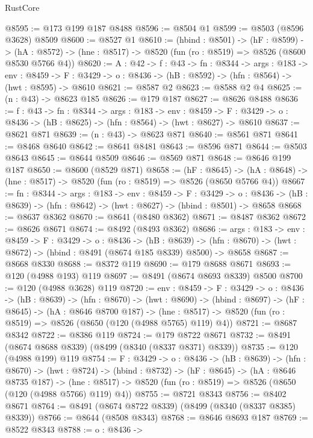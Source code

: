 \begin{lexlean}{RustCore}
\begin{coremodule}
@8595 := @173 @199 @187 @8488
@8596 := @8504 @1
@8599 := @8503 (@8596 @3628) @8509
@8600 := @8527 @1
@8610 := (hbind : @8501) ->
  (hF : @8599) ->
  (hA : @8572) -> (hne : @8517) -> @8520 (fun (ro : @8519) => @8526 (@8600 @8530 @5766 @4))
@8620 := {A : @42} ->
  {f : @43} ->
  {fn : @8344} ->
  {args : @183} ->
  {env : @8459} ->
  {F : @3429} -> {o : @8436} -> (hB : @8592) -> (hfn : @8564) -> (hwt : @8595) -> @8610
@8621 := @8587 @2
@8623 := @8588 @2 @4
@8625 := (n : @43) -> @8623 @185
@8626 := @179 @187
@8627 := @8626 @8488
@8636 := {f : @43} ->
  {fn : @8344} ->
  {args : @183} ->
  {env : @8459} ->
  {F : @3429} -> {o : @8436} -> (hB : @8625) -> (hfn : @8564) -> (hwt : @8627) -> @8610
@8637 := @8621 @871
@8639 := (n : @43) -> @8623 @871
@8640 := @8561 @871
@8641 := @8468 @8640
@8642 := @8641 @8481
@8643 := @8596 @871
@8644 := @8503 @8643
@8645 := @8644 @8509
@8646 := @8569 @871
@8648 := @8646 @199 @187
@8650 := @8600 (@8529 @871)
@8658 := (hF : @8645) ->
  (hA : @8648) -> (hne : @8517) -> @8520 (fun (ro : @8519) => @8526 (@8650 @5766 @4))
@8667 := {fn : @8344} ->
  {args : @183} ->
  {env : @8459} ->
  {F : @3429} ->
  {o : @8436} -> (hB : @8639) -> (hfn : @8642) -> (hwt : @8627) -> (hbind : @8501) -> @8658
@8668 := @8637 @8362
@8670 := @8641 (@8480 @8362)
@8671 := @8487 @8362
@8672 := @8626 @8671
@8674 := @8492 (@8493 @8362)
@8686 := {args : @183} ->
  {env : @8459} ->
  {F : @3429} ->
  {o : @8436} ->
  (hB : @8639) ->
  (hfn : @8670) -> (hwt : @8672) -> (hbind : @8491 (@8674 @185 @8339) @8500) -> @8658
@8687 := @8668 @8330
@8688 := @8372 @119
@8690 := @179 @8688 @8671
@8693 := @120 (@4988 @193) @119
@8697 := @8491 (@8674 @8693 @8339) @8500
@8700 := @120 (@4988 @3628) @119
@8720 := {env : @8459} ->
  {F : @3429} ->
  {o : @8436} ->
  (hB : @8639) ->
  (hfn : @8670) ->
  (hwt : @8690) ->
  (hbind : @8697) ->
  (hF : @8645) ->
  (hA : @8646 @8700 @187) ->
  (hne : @8517) -> @8520 (fun (ro : @8519) => @8526 (@8650 (@120 (@4988 @5765) @119) @4))
@8721 := @8687 @8342
@8722 := @8386 @119
@8724 := @179 @8722 @8671
@8732 := @8491 (@8674 @8688 @8339) (@8499 (@8340 (@8337 @8371) @8339))
@8735 := @120 (@4988 @199) @119
@8754 := {F : @3429} ->
  {o : @8436} ->
  (hB : @8639) ->
  (hfn : @8670) ->
  (hwt : @8724) ->
  (hbind : @8732) ->
  (hF : @8645) ->
  (hA : @8646 @8735 @187) ->
  (hne : @8517) -> @8520 (fun (ro : @8519) => @8526 (@8650 (@120 (@4988 @5766) @119) @4))
@8755 := @8721 @8343
@8756 := @8402 @8671
@8764 := @8491 (@8674 @8722 @8339) (@8499 (@8340 (@8337 @8385) @8339))
@8766 := @8644 (@8508 @8343)
@8768 := @8646 @8693 @187
@8769 := @8522 @8343
@8788 := {o : @8436} ->

\end{coremodule}
\end{lexlean}

